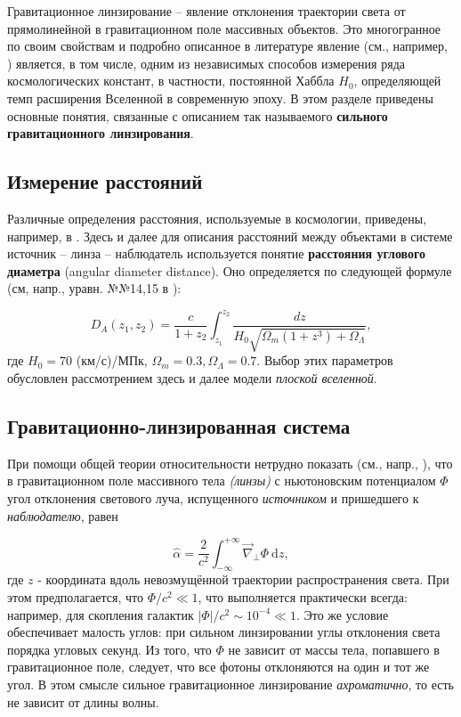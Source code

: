 Гравитационное линзирование -- явление отклонения траектории света от прямолинейной в гравитационном поле массивных объектов.  Это многогранное по своим свойствам и подробно описанное в литературе явление (см., например, \cite{gravlensbook}) является, в том числе, одним из независимых способов измерения ряда космологических констант, в частности, постоянной Хаббла $H_0$, определяющей темп расширения Вселенной в современную эпоху. В этом разделе приведены основные понятия, связанные с описанием так называемого \textbf{сильного гравитационного линзирования}. 

\subsection{Измерение расстояний}

Различные определения расстояния, используемые в космологии, приведены, например, в \cite{distance_measures}. Здесь и далее для описания расстояний между объектами в системе источник -- линза -- наблюдатель используется понятие \textbf{расстояния углового диаметра} (angular diameter distance). Оно определяется по следующей формуле (см, напр., уравн. №№14,15 в \cite{distance_measures}):

\begin{equation}\label{ang_dia_dist}
D_{A}\left(z_{1}, z_{2}\right)=\frac{c}{1+z_{2}} \int_{z_{1}}^{z_{2}} \frac{d z}{H_{0} \sqrt{\Omega_{m}\left(1+z^{3}\right)+\Omega_{\Lambda}}},
\end{equation}
где $H_0=70$ (км/с)/МПк, $\Omega_m=0.3, \Omega_\Lambda=0.7$. Выбор этих параметров обусловлен рассмотрением здесь и далее модели \textit{плоской вселенной}.

\subsection{Гравитационно-линзированная система}

При помощи общей теории относительности нетрудно показать (см., напр., \cite{gl_all}), что в гравитационном поле массивного тела \textit{(линзы)} с ньютоновским потенциалом $\Phi$ угол отклонения светового луча, испущенного \textit{источником} и пришедшего к \textit{наблюдателю}, равен

\begin{equation}
\hat{\alpha}=\frac{2}{c^{2}} \int_{-\infty}^{+\infty} \vec{\nabla}_{\perp} \Phi \ \mathrm{d} z,
\end{equation}
где $z$ - координата вдоль невозмущённой траектории распространения света. При этом предполагается, что $\Phi/c^2 \ll 1$, что выполняется практически всегда: например, для скопления галактик  $|\Phi|/c^2 \sim 10^{-4} \ll 1$. Это же условие обеспечивает малость углов: при сильном линзировании углы отклонения света порядка угловых секунд. Из того, что $\Phi$ не зависит от массы тела, попавшего в гравитационное поле, следует, что все фотоны отклоняются на один и тот же угол. В этом смысле сильное гравитационное линзирование \textit{ахроматично}, то есть не зависит от длины волны. 

